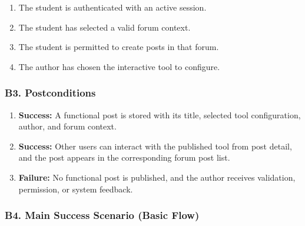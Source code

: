 \documentclass[12pt]{article}
\begin{document}
\begin{enumerate}
\item The student is authenticated with an active session.
\item The student has selected a valid forum context.
\item The student is permitted to create posts in that forum.
\item The author has chosen the interactive tool to configure.
\end{enumerate}
\par\medskip

\hypertarget{sec:b3-postconditions}{}
\subsubsection*{B3. Postconditions}
\par\medskip

\begin{enumerate}
\item \textbf{Success:} A functional post is stored with its title, selected tool configuration, author, and forum context.
\item \textbf{Success:} Other users can interact with the published tool from post detail, and the post appears in the corresponding forum post list.
\item \textbf{Failure:} No functional post is published, and the author receives validation, permission, or system feedback.
\end{enumerate}
\par\medskip

\hypertarget{sec:b4-main-success-scenario-basic-flow}{}
\subsubsection*{B4. Main Success Scenario (Basic Flow)}
\par\medskip
\end{document}
